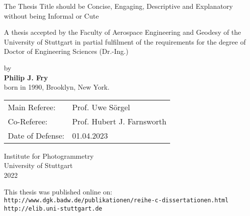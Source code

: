 \begin{titlepage} 
	\begin{center} 
		
		\vspace*{8em}
		
		{\huge  The Thesis Title should be Concise, Engaging, Descriptive and Explanatory without being Informal or Cute} 
		
		\vspace{8em} 
	
		{\large
		A thesis accepted by the Faculty of Aerospace Engineering and Geodesy of the
University of Stuttgart in partial fulfilment of the requirements for the degree of \\
Doctor of Engineering Sciences (Dr.-Ing.)
		}
		\vspace{8em} 
		
		{\large
		by\\ \vspace{1em}
		\textbf{Philip J. Fry } \\ \vspace{1em}
		born in 1990, Brooklyn, New York.
		}
		
		\vspace{8em} 
	
	\end{center} 
	
		\large
		\begin{tabular}{ll} 
			Main Referee:     &  Prof. Uwe Sörgel    \\ 
			Co-Referee:       &  Prof. Hubert J. Farnsworth    \\ 
	    	Date of Defense:  &  01.04.2023 \\ 
		\end{tabular}
		
		\vspace*{\fill}
		
	\begin{center}
		Institute for Photogrammetry \\ University of Stuttgart\\
		2022
	\end{center}

\end{titlepage} 
\restoregeometry %

\vspace*{\fill}
\begin{center}
This thesis was published online on: \\
\vspace{0.5cm}
\texttt{http://www.dgk.badw.de/publikationen/reihe-c-dissertationen.html} \\
\texttt{http://elib.uni-stuttgart.de}
\end{center}
%
